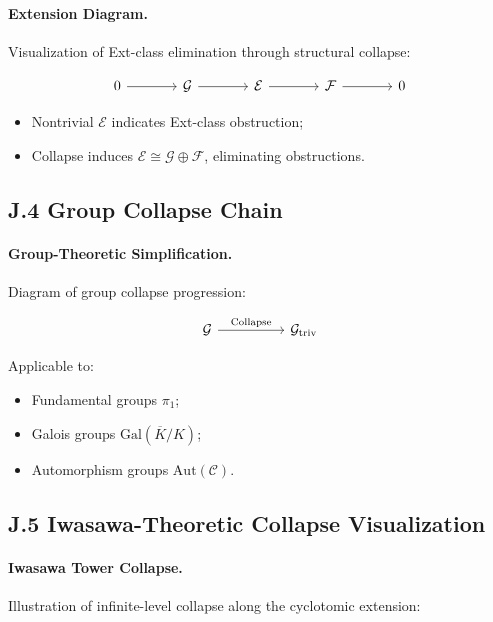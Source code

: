\documentclass[11pt]{article}
\begin{document}
\paragraph{Extension Diagram.}  
Visualization of Ext-class elimination through structural collapse:

\[
\begin{tikzcd}[row sep=large, column sep=large]
0 \arrow[r] & \mathcal{G} \arrow[r] & \mathcal{E} \arrow[r] & \mathcal{F} \arrow[r] & 0
\end{tikzcd}
\]

\begin{itemize}
    \item Nontrivial $\mathcal{E}$ indicates Ext-class obstruction;
    \item Collapse induces $\mathcal{E} \cong \mathcal{G} \oplus \mathcal{F}$, eliminating obstructions.
\end{itemize}

\subsection*{J.4 Group Collapse Chain}

\paragraph{Group-Theoretic Simplification.}  
Diagram of group collapse progression:

\[
\begin{tikzcd}[column sep=huge]
\mathcal{G} \arrow[r, "\text{Collapse}"] & \mathcal{G}_{\mathrm{triv}}
\end{tikzcd}
\]

Applicable to:

\begin{itemize}
    \item Fundamental groups $\pi_1$;
    \item Galois groups $\mathrm{Gal}(\overline{K}/K)$;
    \item Automorphism groups $\mathrm{Aut}(\mathcal{C})$.
\end{itemize}

\subsection*{J.5 Iwasawa-Theoretic Collapse Visualization}

\paragraph{Iwasawa Tower Collapse.}  
Illustration of infinite-level collapse along the cyclotomic extension:
\end{document}
